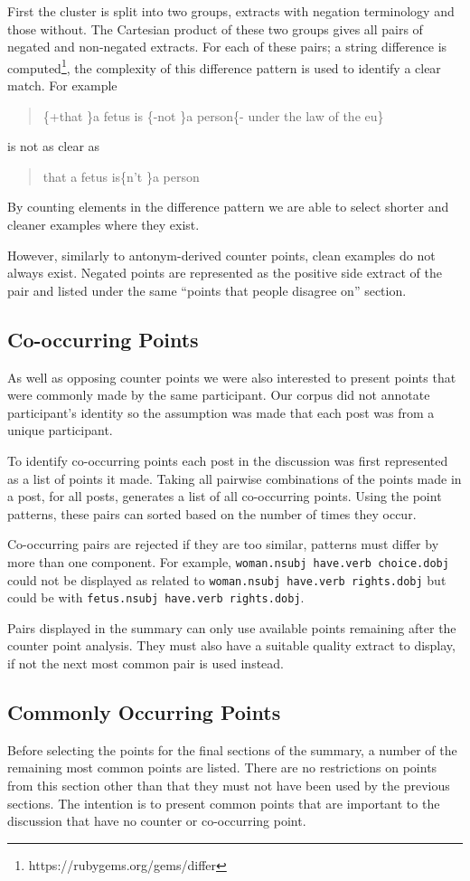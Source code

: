       First the cluster is split into two groups, extracts with negation terminology and those without. The Cartesian product of these two groups gives all pairs of negated and non-negated extracts. For each of these pairs; a string difference is computed\footnote{https://rubygems.org/gems/differ}, the complexity of this difference pattern is used to identify a clear match. For example \blockquote{\{+that \}a fetus is \{-not \}a person\{- under the law of the eu\}} is not as clear as \blockquote{that a fetus is\{n't \}a person}. By counting elements in the difference pattern we are able to select shorter and cleaner examples where they exist.

      However, similarly to antonym-derived counter points, clean examples do not always exist. Negated points are represented as the positive side extract of the pair and listed under the same ``points that people disagree on'' section.

    \subsection{Co-occurring Points}
      As well as opposing counter points we were also interested to present points that were commonly made by the same participant. Our corpus did not annotate participant's identity so the assumption was made that each post was from a unique participant.

      To identify co-occurring points each post in the discussion was first represented as a list of points it made. Taking all pairwise combinations of the points made in a post, for all posts, generates a list of all co-occurring points. Using the point patterns, these pairs can sorted based on the number of times they occur.

      Co-occurring pairs are rejected if they are too similar, patterns must differ by more than one component. For example, \texttt{woman.nsubj have.verb choice.dobj} could not be displayed as related to \texttt{woman.nsubj have.verb rights.dobj} but could be with \texttt{fetus.nsubj have.verb rights.dobj}.

      Pairs displayed in the summary can only use available points remaining after the counter point analysis. They must also have a suitable quality extract to display, if not the next most common pair is used instead.
    \subsection{Commonly Occurring Points}
      Before selecting the points for the final sections of the summary, a number of the remaining most common points are listed. There are no restrictions on points from this section other than that they must not have been used by the previous sections. The intention is to present common points that are important to the discussion that have no counter or co-occurring point.

